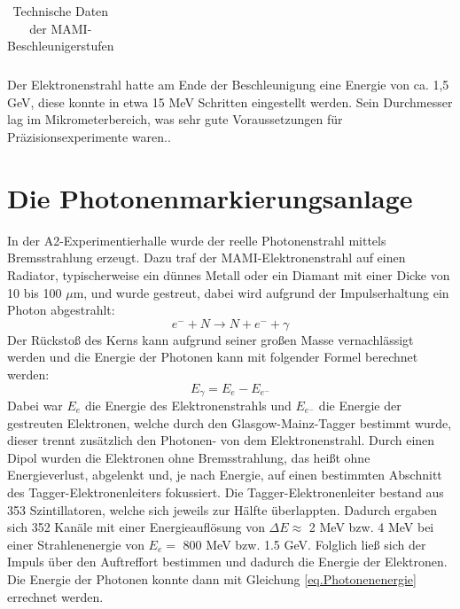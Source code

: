 \documentclass[a4paper,11pt,oneside,final,german,openbib,pdftex]{scrbook}
\begin{document}
{\begin{table}[h!]
\begin{center}
\begin{tabular}{|l|c|c|c|c|}
	
		\end{tabular}
		\caption{Technische Daten der MAMI-Beschleunigerstufen \cite{Un08}}
		\label{tab.MAMIstufen}
	\end{center}
\end{table}


 Der Elektronenstrahl hatte am Ende der Beschleunigung eine Energie von ca. 1,5 GeV, diese konnte in etwa 15 MeV Schritten eingestellt werden. Sein Durchmesser lag im Mikrometerbereich, was sehr gute Voraussetzungen f\"ur Pr\"azisionsexperimente waren.\cite{KPh07}. 
 
 
 \section{Die Photonenmarkierungsanlage}
 
 In der A2-Experimentierhalle wurde der reelle Photonenstrahl mittels Bremsstrahlung erzeugt. Dazu traf der MAMI-Elektronenstrahl auf einen Radiator, typischerweise ein d\"unnes Metall oder ein Diamant mit einer Dicke von 10 bis 100 $\mu$m, und wurde gestreut, dabei wird aufgrund der Impulserhaltung ein Photon abgestrahlt:
 \begin{equation}
 e^{-}+N\rightarrow N + e^{-}+\gamma
 \label{eq.Streuung}
 \end{equation}
  Der R\"ucksto{\ss} des Kerns kann aufgrund seiner gro{\ss}en Masse vernachl\"assigt werden und die Energie der Photonen kann mit folgender Formel berechnet werden:
  \begin{equation}
  E_{\gamma}= E_{e^{}}-E_{e^-}
  \label{eq.Photonenenergie}
  \end{equation}
 Dabei war $E_e$ die Energie des Elektronenstrahls und $E_{e^-}$ die Energie der gestreuten Elektronen, welche durch den Glasgow-Mainz-Tagger bestimmt wurde, dieser trennt zus\"atzlich den Photonen- von dem Elektronenstrahl. Durch einen Dipol wurden die Elektronen ohne Bremsstrahlung, das hei{\ss}t ohne Energieverlust, abgelenkt und, je nach Energie, auf einen bestimmten Abschnitt des Tagger-Elektronenleiters fokussiert. Die Tagger-Elektronenleiter bestand aus 353 Szintillatoren, welche sich jeweils zur H\"alfte \"uberlappten. Dadurch ergaben sich 352 Kan\"ale mit einer Energieaufl\"osung von $\Delta E \approx$  2 MeV bzw. 4 MeV bei einer Strahlenenergie von $E_e=$ 800 MeV bzw. 1.5 GeV. Folglich lie{\ss} sich der Impuls \"uber den Auftreffort bestimmen und dadurch die Energie der Elektronen. Die Energie der Photonen konnte dann mit Gleichung \ref{eq.Photonenenergie} errechnet werden.
\newline 
}
\end{document}
